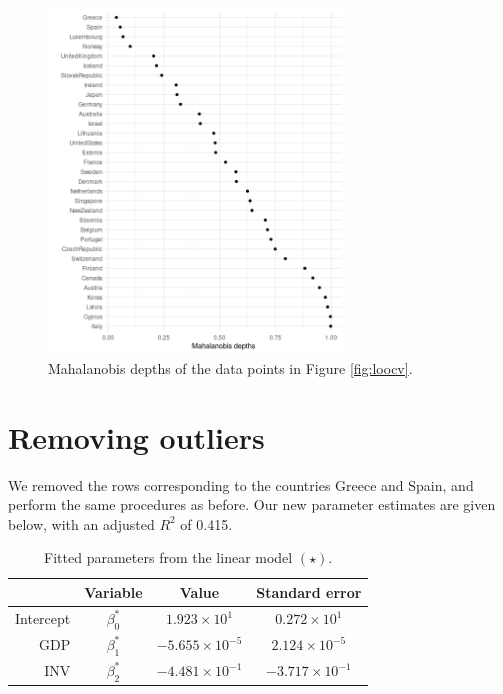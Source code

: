 \documentclass[10pt]{article}
\begin{document}
    \begin{figure}[H]
    \begin{center}
        \includegraphics[width=0.7\textwidth]{mahalanobis_depths}
    \end{center}
    \caption{Mahalanobis depths of the data points in Figure \ref{fig:loocv}.}
    \label{fig:depths}
    \end{figure}


    \section{Removing outliers}

    We removed the rows corresponding to the countries Greece and Spain, and perform
    the same procedures as before. Our new parameter estimates are given below, with
    an adjusted $R^2$ of 0.415.

    \begin{table}[H]
        \centering
        \caption{Fitted parameters from the linear model $(\star)$.}
        \vspace{1em}
        \label{tab:parameters_reduced}
        \begin{tabular}{rccc}
            \hline
                & Variable & Value & Standard error \\\hline
            Intercept & $\beta_0^*$ & $1.923 \times 10^1$ &  $0.272 \times 10^1$ \\
            GDP & $\beta_1^*$ & $-5.655 \times 10^{-5}$ & $2.124 \times 10^{-5}$ \\
            INV & $\beta_2^*$ & $-4.481 \times 10^{-1}$ & $-3.717 \times 10^{-1}$ \\\hline
        \end{tabular}
    \end{table}
\end{document}
